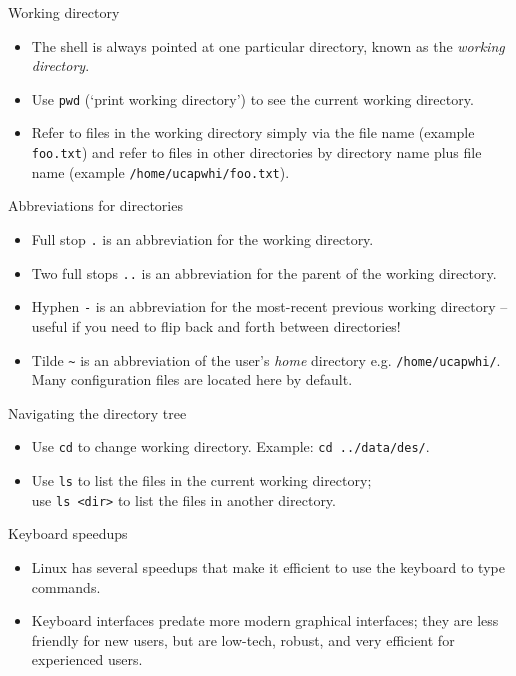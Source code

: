 \documentclass[dvipsnames]{beamer}
\newcommand{\command}[1]{\colorbox{light-gray}{\texttt{#1}}}
\newcommand{\filename}[1]{\colorbox{light-green}{\texttt{#1}}}
\begin{document}
\begin{frame}{Working directory}
  \begin{itemize}
    \item The shell is always pointed at one particular directory, known as the \textit{working directory}.
    \item Use \command{pwd} (`print working directory') to see the current working directory.
    \item Refer to files in the working directory simply via the file name (example \filename{foo.txt}) and refer to files in other directories by directory name plus file name (example \filename{/home/ucapwhi/foo.txt}).
  \end{itemize}
\end{frame}


\begin{frame}{Abbreviations for directories}
  \begin{itemize}
    \item Full stop \filename{.} is an abbreviation for the working directory.
    \item Two full stops \filename{..} is an abbreviation for the parent of the working directory.
    \item Hyphen \filename{-} is an abbreviation for the most-recent previous working directory -- useful if you need to flip back and forth between directories!
    \item Tilde \filename{\textasciitilde} is an abbreviation of the user's \textit{home} directory e.g. \filename{/home/ucapwhi/}. Many configuration files are located here by default.
  \end{itemize}
\end{frame}


\begin{frame}{Navigating the directory tree}
  \begin{itemize}
    \item Use \command{cd} to change working directory. Example: \command{cd ../data/des/}.
    \item Use \command{ls} to list the files in the current working directory; \\use \command{ls <dir>} to list the files in another directory.
  \end{itemize}
\end{frame}


\begin{frame}{Keyboard speedups}
  \begin{itemize}
    \item Linux has several speedups that make it efficient to use the keyboard to type commands.
    \item Keyboard interfaces predate more modern graphical interfaces; they are less friendly for new users, but are low-tech, robust, and very efficient for experienced users.
  \end{itemize}
\end{frame}
\end{document}
